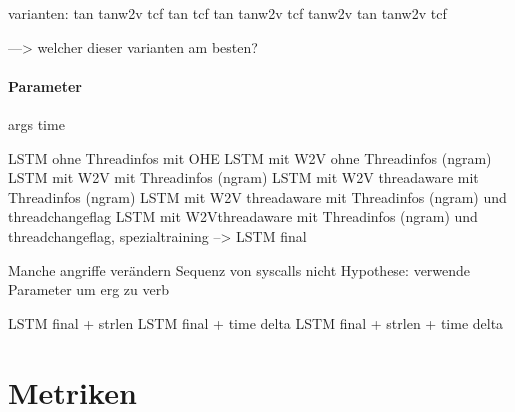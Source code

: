                 varianten:
                tan
                tanw2v
                tcf
                tan tcf
                tan tanw2v
                tcf tanw2v
                tan tanw2v tcf

                ---> welcher dieser varianten am besten?

            \paragraph{Parameter}
                args
                time

                \ac{LSTM} ohne Threadinfos mit OHE
                LSTM mit W2V ohne Threadinfos (ngram)
                LSTM mit W2V mit Threadinfos (ngram)
                LSTM mit W2V threadaware mit Threadinfos (ngram)
                LSTM mit W2V threadaware mit Threadinfos (ngram) und threadchangeflag
                LSTM mit W2Vthreadaware mit Threadinfos (ngram) und threadchangeflag, spezialtraining
                --> LSTM final

                Manche angriffe verändern Sequenz von syscalls nicht
                Hypothese:
                verwende Parameter um erg zu verb

                LSTM final + strlen
                LSTM final + time delta
                LSTM final + strlen + time delta

                \fi

\section{Metriken}\label{sec:Metriken}

